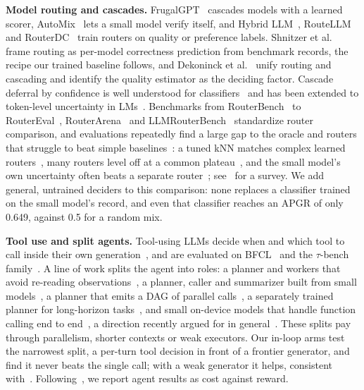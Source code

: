 \textbf{Model routing and cascades.}
FrugalGPT~\cite{chen2023frugalgpt} cascades models with a learned scorer, AutoMix~\cite{aggarwal2023automix} lets a small model verify itself, and Hybrid LLM~\cite{ding2024hybrid}, RouteLLM~\cite{ong2024routellm} and RouterDC~\cite{chen2024routerdc} train routers on quality or preference labels.
Shnitzer et al.~\cite{shnitzer2023large} frame routing as per-model correctness prediction from benchmark records, the recipe our trained baseline follows, and Dekoninck et al.~\cite{dekoninck2025unified} unify routing and cascading and identify the quality estimator as the deciding factor.
Cascade deferral by confidence is well understood for classifiers~\cite{jitkrittum2023when} and has been extended to token-level uncertainty in LMs~\cite{gupta2024language}.
Benchmarks from RouterBench~\cite{hu2024routerbench} to RouterEval~\cite{huang2025routereval}, RouterArena~\cite{lu2025routerarena} and LLMRouterBench~\cite{li2026llmrouterbench} standardize router comparison, and evaluations repeatedly find a large gap to the oracle and routers that struggle to beat simple baselines~\cite{li2026llmrouterbench}: a tuned kNN matches complex learned routers~\cite{li2025rethinking}, many routers level off at a common plateau~\cite{lu2026routing}, and the small model's own uncertainty often beats a separate router~\cite{ramirez2024optimising}; see~\cite{varangotreille2026doing} for a survey.
We add general, untrained deciders to this comparison: none replaces a classifier trained on the small model's record, and even that classifier reaches an APGR of only 0.649, against 0.5 for a random mix.

\textbf{Tool use and split agents.}
Tool-using LLMs decide when and which tool to call inside their own generation~\cite{schick2023toolformer,patil2024gorilla,qin2024toolllm}, and are evaluated on BFCL~\cite{patil2025bfcl} and the $\tau$-bench family~\cite{yao2024taubench,barres2025tau2}.
A line of work splits the agent into roles: a planner and workers that avoid re-reading observations~\cite{xu2023rewoo}, a planner, caller and summarizer built from small models~\cite{shen2024small}, a planner that emits a DAG of parallel calls~\cite{kim2024llmcompiler}, a separately trained planner for long-horizon tasks~\cite{erdogan2025planandact}, and small on-device models that handle function calling end to end~\cite{erdogan2024tinyagent,chen2024octopus}, a direction recently argued for in general~\cite{belcak2025small}.
These splits pay through parallelism, shorter contexts or weak executors.
Our in-loop arms test the narrowest split, a per-turn tool decision in front of a frontier generator, and find it never beats the single call; with a weak generator it helps, consistent with~\cite{shen2024small}.
Following~\cite{kapoor2025agents}, we report agent results as cost against reward.

